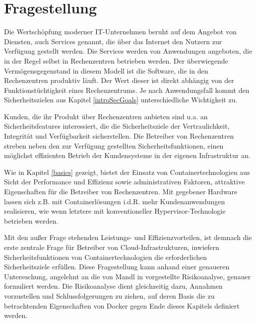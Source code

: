 \documentclass[../main.tex]{subfiles}
\begin{document}
\chapter{Fragestellung}
\label{question}
  Die Wertschöpfung moderner IT-Unternehmen beruht auf dem Angebot von Diensten, auch Services genannt, die über das Internet den Nutzern zur Verfügung gestellt werden. Die Services werden von Anwendungen angeboten, die in der Regel selbst in Rechenzentren betrieben werden. Der überwiegende Vermögensgegenstand in diesem Modell ist die Software, die in den Rechenzentren produktiv läuft. Der Wert dieser ist direkt abhängig von der Funktionstüchtigkeit eines Rechenzentrums. Je nach Anwendungsfall kommt den Sicherheitszielen aus Kapitel \ref{introSecGoals} unterschiedliche Wichtigkeit zu.

  Kunden, die ihr Produkt über Rechenzentren anbieten sind u.a. an Sicherheitsfeatures interessiert, die die Sicherheitsziele der Vertraulichkeit, Integrität und Verfügbarkeit sicherstellen.
  Die Betreiber von Rechenzentren streben neben den zur Verfügung gestellten Sicherheitsfunktionen, einen möglichst effizienten Betrieb der Kundensysteme in der eigenen Infrastruktur an.

  Wie in Kapitel \ref{basics} gezeigt, bietet der Einsatz von Containertechnologien aus Sicht der Performance und Effizienz sowie administrativen Faktoren, attraktive Eigenschaften für die Betreiber von Rechenzentren. Mit gegebener Hardware lassen sich z.B. mit Containerlösungen i.d.R. mehr Kundenanwendungen realisieren, wie wenn letztere mit konventioneller Hypervisor-Technologie betrieben werden.


  Mit den außer Frage stehenden Leistungs- und Effizienzvorteilen, ist demnach die erste zentrale Frage für Betreiber von Cloud-Infrastrukturen, inwiefern Sicherheitsfunktionen von Containertechnologien die erforderlichen Sicherheitsziele erfüllen. Diese Fragestellung kann anhand einer genaueren Untersuchung, angelehnt an die von Mandl in \cite[S.36]{CISSP} vorgestellte Risikoanalyse, genauer formuliert werden. Die Risikoanalyse dient gleichzeitig dazu, Annahmen vorzustellen und Schlussfolgerungen zu ziehen, auf deren Basis die zu betrachtenden Eigenschaften von Docker gegen Ende dieses Kapitels definiert werden.
\end{document}
